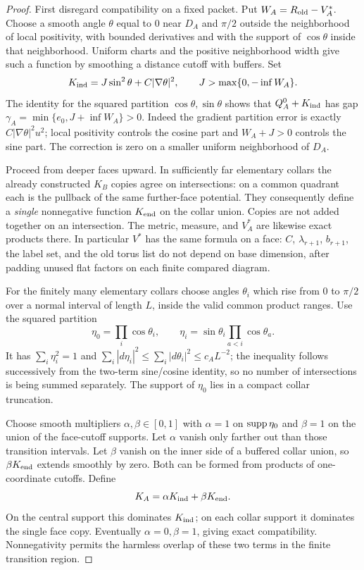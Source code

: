 \begin{proof}
First disregard compatibility on a fixed packet.  Put
$W_A=R_{\rm old}-V_A^*$.  Choose a smooth angle $\theta$ equal to
$0$ near $D_A$ and $\pi/2$ outside the neighborhood of local positivity,
with bounded derivatives and with the support of $\cos\theta$ inside
that neighborhood.  Uniform charts and the positive neighborhood
width give such a function by smoothing a distance cutoff with
buffers.  Set
\[
 K_{\rm ind}=J\sin^2\theta+C|\nabla\theta|^2,
 \qquad J>\max\{0,-\inf W_A\}.
\]
The identity for the squared partition $\cos\theta,\sin\theta$
shows that $Q_A^0+K_{\rm ind}$ has gap
$\gamma_A=\min\{e_0,J+\inf W_A\}>0$.  Indeed the gradient
partition error is exactly $C|\nabla\theta|^2u^2$; local positivity
controls the cosine part and $W_A+J>0$ controls the sine part.
The correction is zero on a smaller uniform neighborhood of $D_A$.

Proceed from deeper faces upward.  In sufficiently far elementary
collars the already constructed $K_B$ copies agree on intersections:
on a common quadrant each is the pullback of the same further-face
potential.  They consequently define a \emph{single} nonnegative
function $K_{\rm end}$ on the collar union.  Copies are not added
together on an intersection.  The metric, measure, and $V_A^*$ are
likewise exact products there.  In particular $V^*$ has the same
formula on a face: $C$, $\lambda_{r+1}$, $b_{r+1}$, the label set,
and the old torus list do not depend on base dimension, after padding
unused flat factors on each finite compared diagram.

For the finitely many elementary collars choose angles $\theta_i$
which rise from $0$ to $\pi/2$ over a normal interval of length $L$,
inside the valid common product ranges.  Use the squared partition
\[
 \eta_0=\prod_i\cos\theta_i,\qquad
 \eta_i=\sin\theta_i\prod_{a<i}\cos\theta_a.
\]
It has $\sum_i\eta_i^2=1$ and
$\sum_i|d\eta_i|^2\le\sum_i|d\theta_i|^2\le c_A L^{-2}$;
the inequality follows successively from the two-term sine/cosine
identity, so no number of intersections is being summed separately.
The support of $\eta_0$ lies in a compact collar truncation.

Choose smooth multipliers $\alpha,\beta\in[0,1]$ with $\alpha=1$
on $\operatorname{supp}\eta_0$ and $\beta=1$ on the union of the face-cutoff
supports.  Let $\alpha$ vanish only farther out than those transition
intervals.  Let $\beta$ vanish on the inner side of a buffered collar
union, so $\beta K_{\rm end}$ extends smoothly by zero.  Both can be
formed from products of one-coordinate cutoffs.  Define
\[
 K_A=\alpha K_{\rm ind}+\beta K_{\rm end}.
\]
On the central support this dominates $K_{\rm ind}$; on each collar
support it dominates the single face copy.  Eventually
$\alpha=0,\beta=1$, giving exact compatibility.  Nonnegativity permits
the harmless overlap of these two terms in the finite transition
region.


\end{proof}
